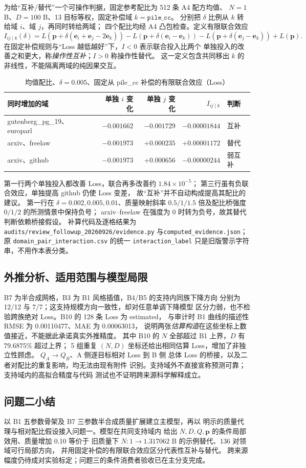 为给“互补/替代”一个可操作判据，固定参考配比为 512 条 A4 配方均值、
$N=1$ B、$D=100$ B、13 目标等权，固定补偿域 $k=\texttt{pile\_cc}$。
分别把 $\delta$ 比例从 $k$ 转给域 $i$、域 $j$，再同时转给两域；
四个配比均经 A4 凸包检查。定义有限联合效应
\[
I_{ij\mid k}(\delta)=L(\boldsymbol p+\delta(\boldsymbol e_i+\boldsymbol e_j-2\boldsymbol e_k))
-L(\boldsymbol p+\delta(\boldsymbol e_i-\boldsymbol e_k))
-L(\boldsymbol p+\delta(\boldsymbol e_j-\boldsymbol e_k))+L(\boldsymbol p).
\]
在固定补偿规则与“Loss 越低越好”下，$I<0$ 表示联合投入比两个
单独投入的改善之和更大，称\emph{操作性互补}；$I>0$ 称操作性替代。
这一定义包含共同移出 $k$ 的非线性，不能隔离两域的纯因果交互。
\begin{table}[htbp]\centering\small
\caption{均值配比、$\delta=0.005$、固定从 pile\_cc 补偿的有限联合效应（Loss）}
\label{tab:cyj-q2-joint}
\begin{tabular}{lrrrl}\toprule
同时增加的域 & 单独 $i$ 变化 & 单独 $j$ 变化 & $I_{ij\mid k}$ & 判断\\\midrule
gutenberg\_pg\_19、europarl & $-0.001662$ & $-0.001729$ & $-0.00001844$ & 互补\\
arxiv、freelaw & $-0.001973$ & $+0.000235$ & $+0.00001172$ & 替代\\
arxiv、github & $-0.001973$ & $+0.000656$ & $-0.00000244$ & 弱互补\\
\bottomrule\end{tabular}
\end{table}
第一行两个单独投入都改善 Loss，联合再多改善约 $1.84\times10^{-5}$；
第三行虽有负联合效应，单独提高 github 仍使 Loss 变差，
故“互补”并不自动构成提高其配比的建议。
第一行在 $\delta=0.002,0.005,0.01$、质量映射斜率
$0.5/1/1.5$ 倍及配比桥强度 $0/1/2$ 的所测情景中保持负号；
arxiv--freelaw 在强度为 0 时转为负号，故其替代判断依赖桥接假设。
补算代码及逐格结果为\texttt{audits/review\_followup\_20260926/evidence.py}
与\texttt{computed\_evidence.json}；原
\texttt{domain\_pair\_interaction.csv} 的统一
\texttt{interaction\_label} 只是旧版警示字符串，不用作本表分类。

\subsection{外推分析、适用范围与模型局限}

B7 为半合成网格，B3 为 B1 风格插值，B4/B5 的支持内同族下降方向
分别为 12/12 与 7/7；这支持规模方向一致性，却对任意单调下降模型
区分力弱，也不检验跨族绝对 Loss。B10 的 128 条 Loss 为 estimated，
与审计时 B1 曲线的描述性 RMSE 为 0.00110477、MAE 为 0.00063013，
说明两张\emph{估算构造}在这些坐标上数值接近，不能据此承诺真实外推精度。
其中 B10 的 $N$ 全部超过 B1 上界，$D$ 有 $79.6875\%$ 超过上界；
5 组重复 $(N,D)$ 坐标还给出相同估算 Loss，增加了非独立性顾虑。
$Q_A\to Q_B$、A 侧逐目标相对 Loss 到 B 侧
总体 Loss 的桥接，以及二者对配比的重复影响，均无法由现有附件
识别。支持域外不直接宣称预测可靠；支持域内的高拟合精度与代码
测试也不证明跨来源科学解释成立。

\subsection{问题二小结}

以 B1 五参数骨架及 B7 三参数半合成质量扩展建立主模型，再以
明示的质量代理与相对配比假设接入问题一。模型在共同支持域内
给出 $N,D,Q,\boldsymbol p$ 的条件局部效用、质量增加 0.10 等价于
旧质量下 $N:1\to1.317062$ B 的示例替代、136 对领域可行局部方向，
并用固定补偿的有限联合效应区分代表性互补与替代。
跨来源幅度仍待成对实验标定；问题三的条件消费者验收已在主分支完成。
